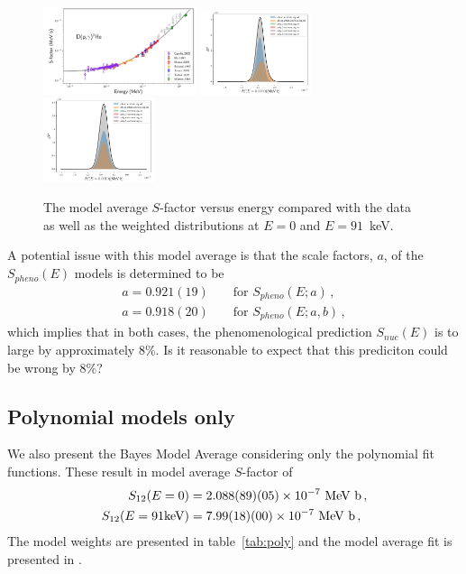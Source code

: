 \documentclass[prd,11pt,superscriptaddress,notitlepage,tightenlines,nofootinbib,floatfix]{revtex4-1}
\begin{document}
\begin{figure}
\includegraphics[width=0.4\textwidth]{figures/S_model_avg_all}
\includegraphics[width=0.29\textwidth]{figures/S_E0.0000_hist_all}
\includegraphics[width=0.29\textwidth]{figures/S_E0.0910_hist_all}
\caption{\label{fig:all_models}
The model average $S$-factor versus energy compared with the data as well as the weighted distributions at $E=0$ and $E=91$~keV.}
\end{figure}

A potential issue with this model average is that the scale factors, $a$, of the $S_{pheno}(E)$ models is determined to be
\begin{align}
&a = 0.921(19)& &\textrm{ for $S_{pheno}(E; a)$}\, ,&
\nonumber\\
&a = 0.918(20)& &\textrm{ for $S_{pheno}(E; a,b)$}\, ,&
\end{align}
which implies that in both cases, the phenomenological prediction $S_{nuc}(E)$ is to large by approximately 8\%.
Is it reasonable to expect that this prediciton could be wrong by 8\%?




\subsection{Polynomial models only}

We also present the Bayes Model Average considering only the polynomial fit functions.
These result in model average $S$-factor of
\begin{align}
S_{12}(E=0) &= 2.088(89)(05)\times10^{-7} \textrm{ MeV b}\, ,
\nonumber\\
S_{12}(E=91{\rm keV}) &= 7.99(18)(00)\times10^{-7} \textrm{ MeV b}\, ,
\end{align}
The model weights are presented in table~\ref{tab:poly} and the model average fit is presented in .
\end{document}
